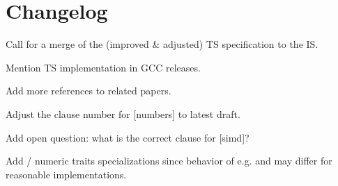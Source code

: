\section{Changelog}
\begin{revision}
\item Call for a merge of the (improved \& adjusted) TS specification to the IS.
\item Mention TS implementation in GCC releases.
\item Add more references to related papers.
\item Adjust the clause number for [numbers] to latest draft.
\item Add open question: what is the correct clause for [simd]?

  \todo Add  / numeric traits specializations since behavior of e.g.  and  may differ for reasonable implementations.
\end{revision}
